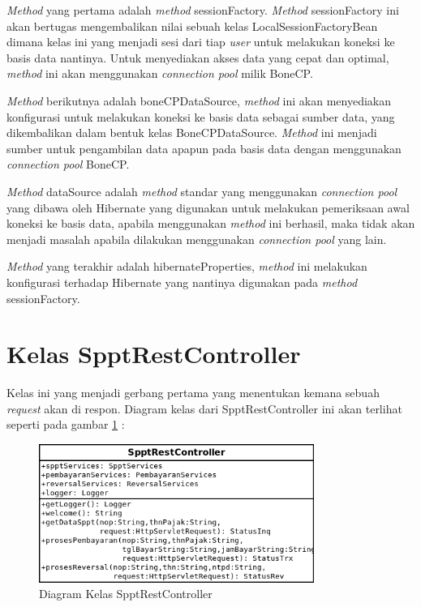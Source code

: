 \textit{Method} yang pertama adalah \textit{method} sessionFactory. \textit{Method} sessionFactory ini akan bertugas mengembalikan nilai sebuah kelas LocalSessionFactoryBean dimana kelas ini yang menjadi sesi dari tiap \textit{user} untuk melakukan koneksi ke basis data nantinya. Untuk menyediakan akses data yang cepat dan optimal, \textit{method} ini akan menggunakan \textit{connection pool} milik BoneCP.

\textit{Method} berikutnya adalah boneCPDataSource, \textit{method} ini akan menyediakan konfigurasi untuk melakukan koneksi ke basis data sebagai sumber data, yang dikembalikan dalam bentuk kelas BoneCPDataSource. \textit{Method} ini menjadi sumber untuk pengambilan data apapun pada basis data dengan menggunakan \textit{connection pool} BoneCP.

\textit{Method} dataSource adalah \textit{method} standar yang menggunakan \textit{connection pool} yang dibawa oleh Hibernate yang digunakan untuk melakukan pemeriksaan awal koneksi ke basis data, apabila menggunakan \textit{method} ini berhasil, maka tidak akan menjadi masalah apabila dilakukan menggunakan \textit{connection pool} yang lain.

\textit{Method} yang terakhir adalah hibernateProperties, \textit{method} ini melakukan konfigurasi terhadap Hibernate yang nantinya digunakan pada \textit{method} sessionFactory.

\section{Kelas SpptRestController}

Kelas ini yang menjadi gerbang pertama yang menentukan kemana sebuah \textit{request} akan di respon. Diagram kelas dari SpptRestController ini akan terlihat seperti pada gambar \ref{fig:uml-class-SpptRestController} :

\begin{figure}[H]
  \centering
  \includegraphics[width=0.8\textwidth]{./resources/uml/uml-class-SpptRestController}
  \caption{Diagram Kelas SpptRestController}
  \label{fig:uml-class-SpptRestController}
\end{figure}

